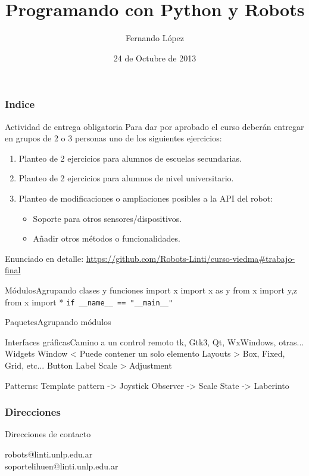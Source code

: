 \documentclass{beamer}[10]
\title{Programando con Python y Robots}
\author{Fernando López}
\institute{LINTI \\ Facultad de Informática \\ Universidad Nacional de la Plata
}
\date{24 de Octubre de 2013}
\begin{document}
\frame{\titlepage \vspace{-0.5cm}

}


\frame
{
\frametitle{Indice}
\tableofcontents[pausesection]
}


\begin{frame}{Actividad de entrega obligatoria}
	Para dar por aprobado el curso deberán entregar en grupos de 2 o 3 personas uno de los siguientes ejercicios:
	\begin{enumerate}[<+->]
		\item Planteo de 2 ejercicios para alumnos de escuelas secundarias.
		\item Planteo de 2 ejercicios para alumnos de nivel universitario.
		\item Planteo de modificaciones o ampliaciones posibles a la API del robot:
			\begin{itemize}
				\item Soporte para otros sensores/dispositivos.
				\item Añadir otros métodos o funcionalidades.
			\end{itemize}
	\end{enumerate}
	Enunciado en detalle: \url{https://github.com/Robots-Linti/curso-viedma#trabajo-final}
\end{frame}
\begin{frame}{Módulos}{Agrupando clases y funciones}
import x
import x as y
from x import y,z
from x import *
\verb+if __name__ == "__main__"+
\end{frame}
\begin{frame}{Paquetes}{Agrupando módulos}
\end{frame}
\begin{frame}{Interfaces gráficas}{Camino a un control remoto}
tk, Gtk3, Qt, WxWindows, otras...
Widgets
Window < Puede contener un solo elemento
Layouts > Box, Fixed, Grid, etc...
Button
Label
Scale > Adjustment
\end{frame}
\begin{frame}
Patterns:
Template pattern -> Joystick
Observer -> Scale
State -> Laberinto
\end{frame}
\frame
{
\frametitle{Direcciones}

\begin{block}{Direcciones de contacto}
\begin{center}
robots@linti.unlp.edu.ar \\
soportelihuen@linti.unlp.edu.ar
\end{center}
\end{block}

}
\end{document}
